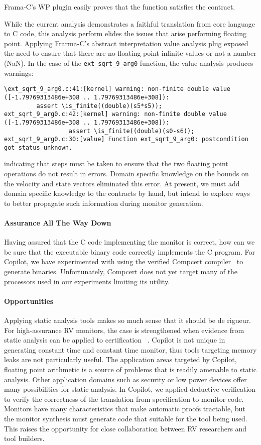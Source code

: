 \noindent
Frama-C's WP plugin easily proves that the function satisfies the
contract. 

While the current analysis demonstrates a faithful translation from
core language to C code, this analysis perform elides the issues that
arise performing floating point. Applying Frarma-C's abstract
interpretation value analysis plug exposed the need to ensure that
there are no floating point infinite values  or not a number (NaN).
In the case of the \texttt{ext\_sqrt\_9\_arg0} function, the value
analysis produces warnings:
\begin{Verbatim}[fontsize=\tiny]
\ext_sqrt_9_arg0.c:41:[kernel] warning: non-finite double value ([-1.79769313486e+308 .. 1.79769313486e+308]):
         assert \is_finite((double)(s5*s5));
ext_sqrt_9_arg0.c:42:[kernel] warning: non-finite double value ([-1.79769313486e+308 .. 1.79769313486e+308]):
                  assert \is_finite((double)(s0-s6));
ext_sqrt_9_arg0.c:30:[value] Function ext_sqrt_9_arg0: postcondition got status unknown.
\end{Verbatim}
indicating that steps must be taken to ensure that the two floating
point operations do not result in errors.  Domain specific knowledge
on the  bounds on the velocity and state vectors  eliminated this
error.  At present, we must add domain specific knowledge to the
contracts by hand, but intend to explore ways to better propagate such
information during monitor generation.  

\paragraph{Assurance All The Way Down} 
Having assured that the C code implementing the monitor is correct,
how can we be sure that the executable binary code correctly
implements the C program. For Copilot, we have experimented
with using the verified Compcert compiler~\cite{leroy} to generate
binaries.  Unfortunately, Compcert does not yet target many of the
processors used in our experiments limiting its utility.

\paragraph{Opportunities} Applying static analysis tools makes so much
sense that it should be de rigueur. For high-assurance RV monitors,
the case is strengthened when evidence from static analysis can be
applied to certification ~\cite{DO333}.  Copilot is not unique in
generating constant time and constant time monitor, thus tools
targeting memory leaks are not particularly useful. The application
areas targeted by Copilot, floating point arithmetic is a source of
problems that is readily amenable to static analysis.  Other
application domains such as security or low power devices offer many
possibilities for static analysis.  In Copilot, we applied deductive
verification to verify the correctness of the translation from
specification to monitor code.  Monitors have many characteristics
that  make automatic proofs tractable, but  the monitor synthesis must
generate code that  suitable for the tool being used. This raises the
opportunity for close collaboration between RV researchers and tool
builders. 